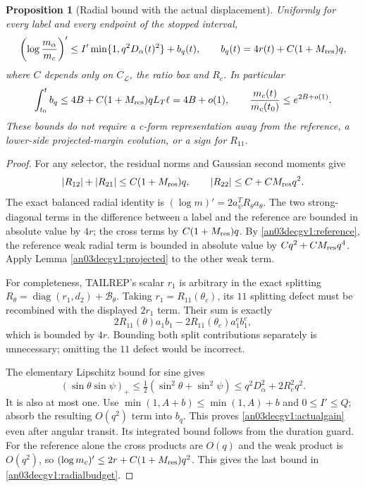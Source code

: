 \documentclass[11pt]{article}
\newtheorem{proposition}{Proposition}[section]
\theoremstyle{remark}\newtheorem{remark}[proposition]{Remark}
\begin{document}
\begin{proposition}[Radial bound with the actual displacement]
\label{an03decgv1:radial}
Uniformly for every label and every endpoint of the stopped interval,
\begin{equation}
 \left(\log\frac{m_\alpha}{m_c}\right)'
 \le I'\min\{1,q^2D_\alpha(t)^2\}+b_q(t),\qquad
 b_q(t)=4r(t)+C(1+M_{\rm res})q,
 \label{an03decgv1:actualgain}
\end{equation}
where $C$ depends only on $C_{\mathcal L}$, the ratio box and
$R_c$. In particular
\begin{equation}
 \int_{t_0}^t b_q\le4B+C(1+M_{\rm res})qL_T\ell=4B+o(1),
 \qquad \frac{m_c(t)}{m_c(t_0)}\le e^{2B+o(1)}.
 \label{an03decgv1:radialbudget}
\end{equation}
These bounds do not require a c-form representation away from
the reference, a lower-side projected-margin evolution, or a
sign for $R_{11}$.
\end{proposition}
\begin{proof}
For any selector, the residual norms and Gaussian second moments
give
\[
 |R_{12}|+|R_{21}|\le C(1+M_{\rm res})q,\qquad
 |R_{22}|\le C+CM_{\rm res}q^2.
\]
The exact balanced radial identity is
$(\log m)'=2a_\psi^TR_\theta a_\theta$.
The two strong-diagonal terms in the difference between a label
and the reference are bounded in absolute value by $4r$;
the cross terms by $C(1+M_{\rm res})q$.
By \eqref{an03decgv1:reference}, the reference weak radial
term is bounded in absolute value by $Cq^2+CM_{\rm res}q^4$.
Apply Lemma \ref{an03decgv1:projected} to the other weak term.

For completeness, TAILREP's scalar $r_1$ is arbitrary in the
exact splitting $R_\theta=\operatorname{diag}(r_1,d_2)
+\mathcal B_\theta$. Taking $r_1=R_{11}(\theta_c)$, its
$11$ splitting defect must be recombined with the displayed
$2r_1$ term. Their sum is exactly
\[
 2R_{11}(\theta)a_1b_1
      -2R_{11}(\theta_c)a_1^cb_1^c,
\]
which is bounded by $4r$. Bounding both split contributions
separately is unnecessary; omitting the $11$ defect would be
incorrect.

The elementary Lipschitz bound for sine gives
\[
 (\sin\theta\sin\psi)_+
 \le\tfrac12(\sin^2\theta+\sin^2\psi)
 \le q^2D_\alpha^2+2R_c^2q^2.
\]
It is also at most one. Use
$\min(1,A+b)\le\min(1,A)+b$ and $0\le I'\le Q$;
absorb the resulting $O(q^2)$ term into $b_q$.
This proves \eqref{an03decgv1:actualgain} even after angular
transit. Its integrated bound follows from the duration guard.
For the reference alone the cross products are $O(q)$ and
the weak product is $O(q^2)$, so
$(\log m_c)'\le2r+C(1+M_{\rm res})q^2$.
This gives the last bound in \eqref{an03decgv1:radialbudget}.
\end{proof}
\end{document}
